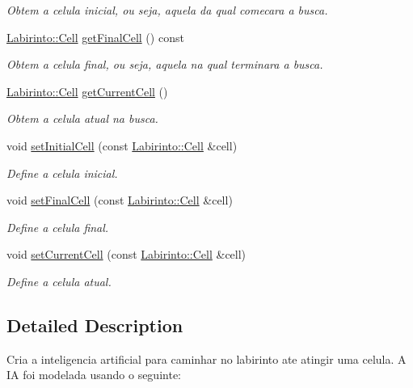 \begin{DoxyCompactItemize}
\begin{DoxyCompactList}\small\item\em Obtem a celula inicial, ou seja, aquela da qual comecara a busca. \end{DoxyCompactList}\item 
\hyperlink{struct_labirinto_1_1_cell}{Labirinto\+::\+Cell} \hyperlink{class_path_finder_a_i_a5489d2faf1c7c3f7cdb401d4624231cf}{get\+Final\+Cell} () const 
\begin{DoxyCompactList}\small\item\em Obtem a celula final, ou seja, aquela na qual terminara a busca. \end{DoxyCompactList}\item 
\hyperlink{struct_labirinto_1_1_cell}{Labirinto\+::\+Cell} \hyperlink{class_path_finder_a_i_add2b9e88e3bd509b837b12297c846f10}{get\+Current\+Cell} ()
\begin{DoxyCompactList}\small\item\em Obtem a celula atual na busca. \end{DoxyCompactList}\item 
void \hyperlink{class_path_finder_a_i_aa95d25fd460d4e12fdaf90e8a8715fc4}{set\+Initial\+Cell} (const \hyperlink{struct_labirinto_1_1_cell}{Labirinto\+::\+Cell} \&cell)
\begin{DoxyCompactList}\small\item\em Define a celula inicial. \end{DoxyCompactList}\item 
void \hyperlink{class_path_finder_a_i_a705c39f6d8596d658742b40d5f707058}{set\+Final\+Cell} (const \hyperlink{struct_labirinto_1_1_cell}{Labirinto\+::\+Cell} \&cell)
\begin{DoxyCompactList}\small\item\em Define a celula final. \end{DoxyCompactList}\item 
void \hyperlink{class_path_finder_a_i_ae8ddaab163d826e91c4893d573c4f302}{set\+Current\+Cell} (const \hyperlink{struct_labirinto_1_1_cell}{Labirinto\+::\+Cell} \&cell)
\begin{DoxyCompactList}\small\item\em Define a celula atual. \end{DoxyCompactList}\end{DoxyCompactItemize}


\subsection{Detailed Description}
Cria a inteligencia artificial para caminhar no labirinto ate atingir uma celula. A I\+A foi modelada usando o seguinte\+: 

